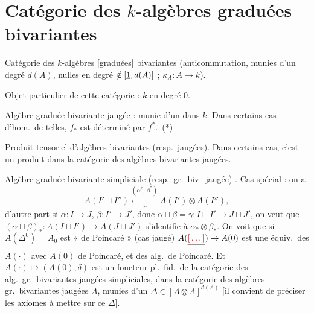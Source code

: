 \documentclass[11pt,a4paper]{article}
\begin{document}
\section*{Catégorie des $k$-algèbres graduées bivariantes}



Catégorie des $k$-algèbres [graduées] \ill{} bivariantes (anticommutation,
munies d'un degré $d(A)$, nulles en degré $\notin [\uncertain{1}, d(A)]$ ;
 $\kappa_{A} : A \to k$).

Objet particulier de cette catégorie : $k$ en degré $0$.

Algèbre graduée bivariante jaugée : munie d'un  dans $k$.
Dans certains cas d'hom.\ de telles, $f_{*}$ est déterminé par $f^{*}$.~(*)

Produit tensoriel d'algèbres bivariantes (resp.\ jaugées). Dans certains cas,
c'est un produit dans la catégorie des algèbres bivariantes jaugées.

Algèbre graduée bivariante simpliciale (resp.\ gr.\ biv.\ jaugée)
\struck{\ill{}}. Cas spécial : on a
\[
  A(I' \sqcup I'') \xleftarrow[\ \sim\ ]{(\alpha^{*},\,\beta^{*})} A(I') \otimes A(I'') ,
\]
d'autre part si $\alpha : I \to J$, $\beta : I' \to J'$, donc
$\alpha \sqcup \beta = \gamma : I \sqcup I' \to J \sqcup J'$, on veut que
$(\alpha \sqcup \beta)_{*} : A(I \sqcup I') \to A(J \sqcup J')$ s'identifie à
$\alpha_{*} \otimes \beta_{*}$.
On voit que si $A(\Delta^{0}) = A_{0}$ est « de Poincaré » (cas jaugé)
$A(\struck{\ill{}}) \to A(0)$ est une équiv.\ des $A(\cdot)$ avec $A(0)$ de
Poincaré, et des alg.\ de Poincaré. Et $A(\cdot) \mapsto (A(0), \delta)$ est
un foncteur pl.\ fid.\ de la catégorie des alg.\ gr.\ bivariantes jaugées
simpliciales, dans la catégorie des algèbres gr.\ bivariantes jaugées $A$,
munies d'un $\Delta \in [A \otimes A]^{d(A)}$ [il convient de préciser les
axiomes à mettre sur ce $\Delta$].
\end{document}

